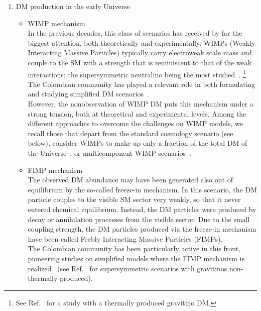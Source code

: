 \documentclass[a4paper,11pt]{article}
\begin{document}
\begin{enumerate}
\item 
DM production in the early Universe
\begin{itemize}
\item 
WIMP mechanism\\
In the previous decades, this class of scenarios has received by far the biggest attention, both theoretically and experimentally. WIMPs (Weakly Interacting Massive Particles) typically carry electroweak scale mass and couple to the SM with a strength that is reminiscent to that of the weak interactions; the supersymmetric neutralino being the most studied~\cite{Masiero:2004vk, Profumo:2004at, Bernal:2007uv, Sierra:2009zq, Bernal:2009jc}.%
\footnote{See Ref.~\cite{Hirsch:2005ag} for a study with a thermally produced gravitino DM.}
The Colombian community has played a relevant role in both formulating and studying simplified DM scenarios~\cite{Yaguna:2008hd, Goudelis:2009zz, Honorez:2010re, LopezHonorez:2010tb, Alvares:2012qv, Esch:2013rta, Martinez:2014ova, Kelso:2014qka, Martinez:2014rea, Martinez:2015wrp, Arbelaez:2015ila, Horiuchi:2016tqw, Dutta:2017lny, Arbelaez:2017ptu}.\\
However, the nonobservation of WIMP DM puts this mechanism under a strong tension, both at theoretical and experimental levels. Among the different approaches to overcome the challenges on WIMP models, we recall those that depart from the standard cosmology scenario (see below), consider WIMPs to make up only a fraction of the total DM of the Universe~\cite{Betancur:2018xtj, Carvajal:2018ohk}, or multicomponent WIMP scenarios~\cite{Esch:2014jpa, Bernal:2018aon, Yaguna:2019cvp, Belanger:2020hyh}. 
\item
FIMP mechanism\\
The observed DM abundance may have been generated also out of equilibrium by the so-called freeze-in mechanism. In this scenario, the DM particle couples to the visible SM sector very weakly, so that it never entered chemical equilibrium. Instead, the DM particles were produced by decay or annihilation processes from the visible sector. Due to the small coupling strength, the DM particles produced via the freeze-in mechanism have been called Feebly Interacting Massive Particles (FIMPs).\\
The Colombian community has been particularly active in this front, pioneering studies on simplified models where the FIMP mechanism is realized~\cite{Yaguna:2011qn, Molinaro:2014lfa, Bernal:2018ins, Bernal:2018kcw} (see Ref.~\cite{Choi:2010jt,Restrepo:2011rj} for supersymmetric scenarios with gravitinos non-thermally produced).

\end{itemize}
\end{enumerate}
\end{document}
